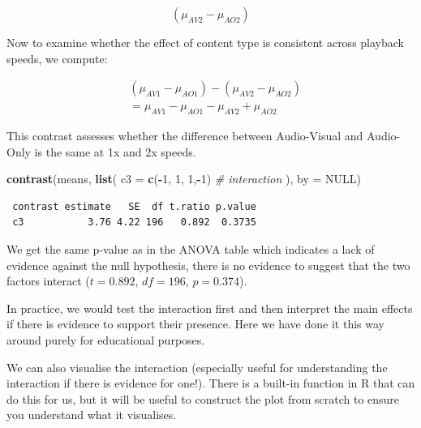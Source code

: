 \documentclass[
  letterpaper,
]{book}
\newenvironment{Shaded}{\begin{snugshade}}{\end{snugshade}}
\newcommand{\AttributeTok}[1]{\textcolor[rgb]{0.13,0.29,0.53}{#1}}
\newcommand{\CommentTok}[1]{\textcolor[rgb]{0.56,0.35,0.01}{\textit{#1}}}
\newcommand{\ConstantTok}[1]{\textcolor[rgb]{0.56,0.35,0.01}{#1}}
\newcommand{\DecValTok}[1]{\textcolor[rgb]{0.00,0.00,0.81}{#1}}
\newcommand{\FunctionTok}[1]{\textcolor[rgb]{0.13,0.29,0.53}{\textbf{#1}}}
\newcommand{\NormalTok}[1]{#1}
\newcommand{\SpecialCharTok}[1]{\textcolor[rgb]{0.81,0.36,0.00}{\textbf{#1}}}
\begin{document}
\[
(\mu_{AV2} - \mu_{AO2})
\]

Now to examine whether the effect of content type is consistent across
playback speeds, we compute:

\[
\begin{aligned}
&(\mu_{AV1} - \mu_{AO1}) - (\mu_{AV2} - \mu_{AO2})\\
& = \mu_{AV1} - \mu_{AO1} - \mu_{AV2} + \mu_{AO2}
\end{aligned}
\]

This contrast assesses whether the difference between Audio-Visual and
Audio-Only is the same at 1x and 2x speeds.


\begin{Shaded}
\begin{Highlighting}[]
\FunctionTok{contrast}\NormalTok{(means,}
         \FunctionTok{list}\NormalTok{(}
           \AttributeTok{c3 =} \FunctionTok{c}\NormalTok{(}\SpecialCharTok{{-}}\DecValTok{1}\NormalTok{, }\DecValTok{1}\NormalTok{, }\DecValTok{1}\NormalTok{,}\SpecialCharTok{{-}}\DecValTok{1}\NormalTok{) }\CommentTok{\# interaction}
\NormalTok{         ),}
         \AttributeTok{by =} \ConstantTok{NULL}\NormalTok{)}
\end{Highlighting}
\end{Shaded}

\begin{verbatim}
 contrast estimate   SE  df t.ratio p.value
 c3           3.76 4.22 196   0.892  0.3735
\end{verbatim}

We get the same p-value as in the ANOVA table which indicates a lack of
evidence against the null hypothesis, there is no evidence to suggest
that the two factors interact (\(t=0.892\), \(df = 196\),
\(p = 0.374\)).

In practice, we would test the interaction first and then interpret the
main effects if there is evidence to support their presence. Here we
have done it this way around purely for educational purposes.

We can also visualise the interaction (especially useful for
understanding the interaction if there is evidence for one!). There is a
built-in function in R that can do this for us, but it will be useful to
construct the plot from scratch to ensure you understand what it
visualises.
\end{document}
